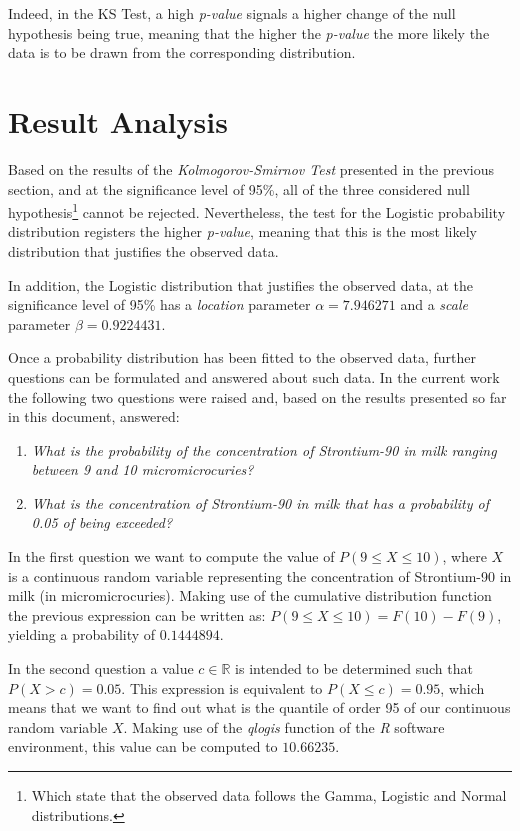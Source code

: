 \documentclass[12pt]{article}
\begin{document}
Indeed, in the KS Test, a high \emph{p-value} signals a higher change of the null hypothesis being true, meaning that the higher the \emph{p-value} the more likely the data is to be drawn from the corresponding distribution.

\section{Result Analysis}
\label{result_analysis}

Based on the results of the \emph{Kolmogorov-Smirnov Test} presented in the previous section, and at the significance level of 95\%, all of the three considered null hypothesis\footnote{Which state that the observed data follows the Gamma, Logistic and Normal distributions.} cannot be rejected. Nevertheless, the test for the Logistic probability distribution registers the higher \emph{p-value}, meaning that this is the most likely distribution that justifies the observed data.

In addition, the Logistic distribution that justifies the observed data, at the significance level of 95\% has a \emph{location} parameter $\alpha=7.946271$ and a \emph{scale} parameter $\beta=0.9224431$.

Once a probability distribution has been fitted to the observed data, further questions can be formulated and answered about such data. In the current work the following two questions were raised and, based on the results presented so far in this document, answered:

\begin{enumerate}
	\item \textsl{What is the probability of the concentration of Strontium-90 in milk ranging between 9 and 10 micromicrocuries?}
	
	\item \textsl{What is the concentration of Strontium-90 in milk that has a probability of 0.05 of being exceeded?}
\end{enumerate}

In the first question we want to compute the value of $P(9 \leq X \leq 10)$, where $X$ is a continuous random variable representing the concentration of Strontium-90 in milk (in micromicrocuries). Making use of the cumulative distribution function the previous expression can be written as: $P(9 \leq X \leq 10) = F(10) - F(9)$, yielding a probability of $0.1444894$.

In the second question a value $c \in \mathbb{R}$ is intended to be determined such that $P(X > c) = 0.05$. This expression is equivalent to $P(X \leq c) = 0.95$, which means that we want to find out what is the quantile of order 95 of our continuous random variable $X$. Making use of the \emph{qlogis} function of the \emph{R} software environment, this value can be computed to $10.66235$.
\end{document}

